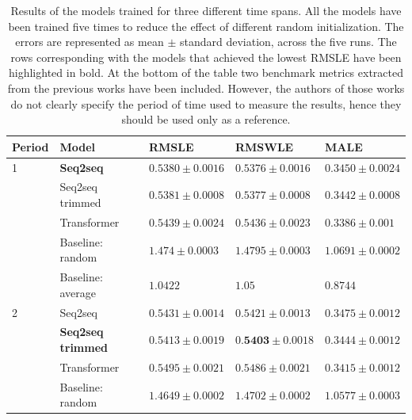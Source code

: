 \begin{table}[h]
\scriptsize
\caption[Results of the models trained for three different time spans.]{Results of the models trained for three different time spans. All the models have been trained five times to reduce the effect of different random initialization. The errors are represented as mean $\pm$ standard deviation, across the five runs. The rows corresponding with the models that achieved the lowest RMSLE have been highlighted in bold. At the bottom of the table two benchmark metrics extracted from the previous works have been included. However, the authors of those works do not clearly specify the period of time used to measure the results, hence they should be used only as a reference.}
	\label{tab:salesforecast_results}
	\centering
	\begin{tabular}{lllll}
		\hline
		Period    & Model                     & RMSLE                          & RMSWLE                         & MALE                           \\ \hline
		1         & \textbf{Seq2seq}          & $ \mathbf{0.5380 \pm 0.0016} $ & $ \mathbf{0.5376 \pm 0.0016 }$ & $  \mathbf{0.3450 \pm 0.0024}$ \\
         & Seq2seq trimmed           & $ 0.5381 \pm 0.0008 $          & $ 0.5377 \pm 0.0008 $          & $ 0.3442 \pm 0.0008 $          \\
         & Transformer               & $ 0.5439 \pm 0.0024 $          & $ 0.5436 \pm 0.0023 $          & $ 0.3386 \pm 0.001 $           \\
         & Baseline: random          & $ 1.474 \pm 0.0003 $           & $ 1.4795 \pm 0.0003 $          & $ 1.0691 \pm 0.0002 $          \\
         & Baseline: average         & $ 1.0422$                      & $ 1.05$                        & $ 0.8744$                      \\ \hline
		2         & Seq2seq                   & $ 0.5431 \pm 0.0014 $          & $ 0.5421 \pm 0.0013 $          & $ 0.3475 \pm 0.0012 $          \\
         & \textbf{Seq2seq trimmed } & $ \mathbf{0.5413 \pm 0.0019} $ & $ 0.\mathbf{5403 \pm 0.0018 }$ & $ \mathbf{0.3444 \pm 0.0012} $ \\
         & Transformer               & $ 0.5495 \pm 0.0021 $          & $ 0.5486 \pm 0.0021 $          & $ 0.3415 \pm 0.0012 $          \\
         & Baseline: random          & $ 1.4649 \pm 0.0002 $          & $ 1.4702 \pm 0.0002 $          & $ 1.0577 \pm 0.0003 $          \\

\end{tabular}
\end{table}
